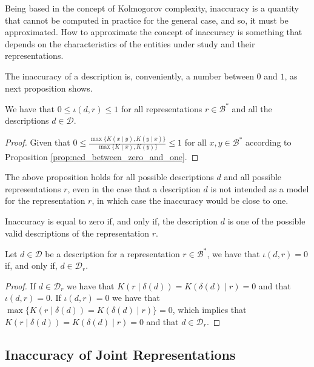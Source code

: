 Being based in the concept of Kolmogorov complexity, inaccuracy is a quantity that cannot be computed in practice for the general case, and so, it must be approximated. How to approximate the concept of inaccuracy is something that depends on the characteristics of the entities under study and their representations.

The inaccuracy of a description is, conveniently, a number between $0$ and $1$, as next proposition shows.

\begin{proposition}
\label{prop:inaccuracy:inaccuracy:range}
We have that $0 \leq \iota(d, r) \leq 1$ for all representations $r \in \mathcal{B}^\ast$ and all the descriptions $d \in \mathcal{D}$.
\end{proposition}
\begin{proof}
Given that $0 \leq \frac{ \max\{ K(x \mid y), K(y \mid x) \} } { \max\{ K(x), K(y) \} } \leq 1$ for all $x, y \in \mathcal{B}^\ast$ according to Proposition \ref{prop:ncd_between_zero_and_one}.
\end{proof}

The above proposition holds for all possible descriptions $d$ and all possible representations $r$, even in the case that a description $d$ is not intended as a model for the representation $r$, in which case the inaccuracy would be close to one.

Inaccuracy is equal to zero if, and only if, the description $d$ is one of the possible valid descriptions of the representation $r$.

\begin{proposition}\label{prop:perfect_description}
Let $d \in \mathcal{D}$ be a description for a representation $r \in \mathcal{B}^\ast$, we have that $\iota(d, r) = 0$ if, and only if, $d \in \mathcal{D}_r$.
\end{proposition}
\begin{proof}
If $d \in \mathcal{D}_r$ we have that $K \left( r \mid \delta(d) \right) = K \left( \delta(d) \mid r \right) = 0$ and that $\iota(d, r) = 0$. If $\iota(d, r) = 0$ we have that $\max\{ K \left( r \mid \delta(d) \right) = K \left( \delta(d) \mid r \right) \} = 0$, which implies that $K \left( r \mid \delta(d) \right) = K \left( \delta(d) \mid r \right) = 0$ and that $d \in \mathcal{D}_r$.
\end{proof}

%
%

\subsection{Inaccuracy of Joint Representations}

